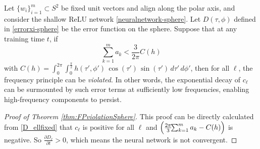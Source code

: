 \documentclass[review,onefignum,onetabnum,onealgnum]{siamart250106}
\numberwithin{theorem}{section}
\begin{document}
\begin{theorem}
\label{thm:FPviolationSphere}
Let \(\{w_i\}_{i=1}^m \subset S^2\) be fixed unit vectors and align along the polar axis, and consider the shallow ReLU network \eqref{neuralnetwork-sphere}. Let \(D(\tau,\phi)\) defined in \eqref{errorxi-sphere} be the error function on the sphere.  
Suppose that at any training time $t$, if $$
\sum_{k=1}^m a_k < \frac{3}{2\pi}C(h)$$
with $C(h) = \int_{0}^{2\pi}\!\!\int_{0}^{\tfrac{\pi}{2}}
h(\tau',\phi')\,\cos(\tau')\,\sin(\tau')\,d\tau'\,d\phi'$, then for all \(\ell\), the frequency principle can be \emph{violated}.  
In other words, the exponential decay of \(c_{\ell}\) can be surmounted by such error terms at sufficiently low 
frequencies, enabling high-frequency components to persist.
\end{theorem}
\begin{proof}[Proof of Theorem \ref{thm:FPviolationSphere}]
    This proof can be directly calculated from \eqref{D_ellfixed} that $c_{\ell}$ is positive for all $\ell$ and $\Bigl(\tfrac{2\pi}{3}\!\!\sum_{k=1}^m a_k - C(h)\Bigr)$ is negative. So $\frac{\partial D_{\ell}}{\partial t} > 0$, which means the neural network is not convergent.




\end{proof}
\end{document}
